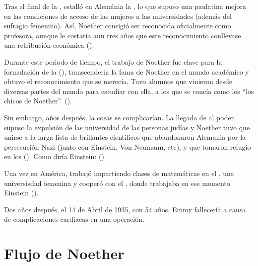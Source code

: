 Tras el final de la , estalló en Alemánia la , lo que supuso una paulatina mejora en las condiciones de acceso de las mujeres a las universidades (además del sufragio femenino).
Así, Noether consigió ser reconocida oficialmente como profesora, aunque le costaría aun tres años que este reconocimiento conllevase una retribución económica (\cite[333]{Carrasco}).

Durante este periodo de tiempo, el trabajo de Noether fue clave para la formulación de la  (\cite{Weyl}), transcendería la fama de Noether en el mundo académico y obtuvo el reconocimiento que se merecía.
Tuvo alumnos que vinieron desde diversas partes del mundo para estudiar con ella, a los que se concía como los \textquotedblleft los chicos de Noether\textquotedblright\ (\cite{Carrasco}).

Sin embargo, años después, la cosas se complicarían.
La llegada de  al poder, supuso la expulsión de las universidad de las personas judías y Noether tuvo que unirse a la larga lista de brillantes cientificos que abandonaron Alemania por la persecución Nazi (junto con Einstein, Von Neumann, etc), y que tomaron refugio en los  (\cite{Kimberling}).
Como diría Einstein:  (\cite{Einstein}).

Una vez en América, trabajó impartiendo clases de matemáticas en el , una universisdad femenina y cooperó con el , donde trabajaba en ese momento Einstein (\cite{Carrasco}).

Dos años después, el 14 de Abril de 1935, con 54 años, Emmy fallecería a causa de complicaciones cardiacas en una operación.

\section{Flujo de Noether}\label{sec:flujo}

